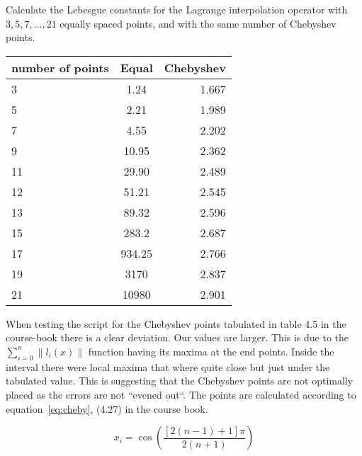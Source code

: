 \begin{problem}
  Calculate the Lebesgue constants for the Lagrange interpolation
  operator with $3, 5, 7, \dots , 21$ equally spaced points, and with the
  same number of Chebyshev points.
\end{problem}


\begin{solution}
  \begin{table}[!ht]
    \begin{center}
      \begin{tabular}{ l  c  r }
        number of points & Equal & Chebyshev \\ \hline
        3 & 1.24 & 1.667 \\
        5 & 2.21 & 1.989 \\
        7 & 4.55 & 2.202 \\
        9 & 10.95 & 2.362 \\
        11 & 29.90 & 2.489 \\
        12 & 51.21 & 2.545 \\
        13 & 89.32 & 2.596 \\
        15 & 283.2 & 2.687 \\
        17 & 934.25 & 2.766 \\
        19 & 3170 & 2.837 \\
        21 & 10980 & 2.901 \\
      \end{tabular}
    \end{center}
  \end{table}

  When testing the script for the Chebyshev points tabulated in table
  4.5 in the course-book there is a clear deviation. Our values are
  larger. This is due to the $\sum_{i=0}^n \|l_i(x)\|$ function having
  its maxima at the end points. Inside the interval there were local
  maxima that where quite close but just under the tabulated
  value. This is suggesting that the Chebyshev points are not
  optimally placed as the errors are not ``evened out``. The points
  are calculated according to equation~\ref{eq:cheby}, (4.27) in the
  course book.
  
  \begin{equation}
    \label{eq:cheby}
    x_i = \cos\left(\frac{[2(n - 1) +1]\pi}{2(n + 1)}\right)
  \end{equation}
\end{solution}

